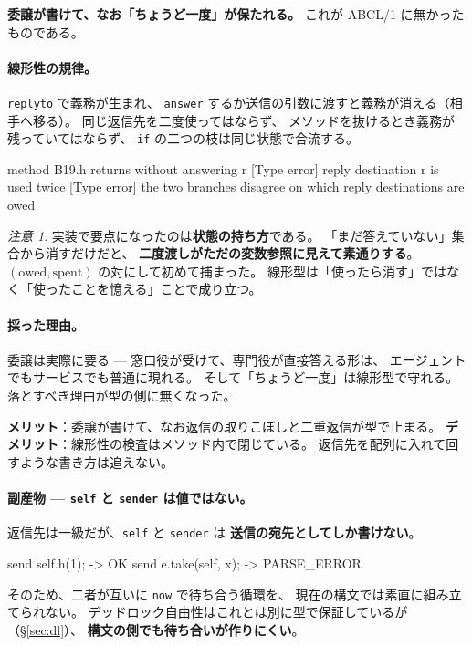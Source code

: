 \documentclass[11pt,a4paper]{ltjsarticle}
\theoremstyle{definition}
\theoremstyle{remark}
\newtheorem{remark}[theorem]{注意}
\begin{document}
\textbf{委譲が書けて、なお「ちょうど一度」が保たれる。}
これが ABCL/1 に無かったものである。

\paragraph{線形性の規律。}
\texttt{replyto} で義務が生まれ、
\texttt{answer} するか送信の引数に渡すと義務が消える（相手へ移る）。
同じ返信先を二度使ってはならず、
メソッドを抜けるとき義務が残っていてはならず、
\texttt{if} の二つの枝は同じ状態で合流する。

\begin{term}
 method B19.h returns without answering r
[Type error] reply destination r is used twice
[Type error] the two branches disagree on which reply destinations are owed
\end{term}

\begin{remark}
実装で要点になったのは\textbf{状態の持ち方}である。
「まだ答えていない」集合から消すだけだと、
\textbf{二度渡しがただの変数参照に見えて素通りする}。
$(\text{owed}, \text{spent})$ の対にして初めて捕まった。
線形型は「使ったら消す」ではなく「使ったことを憶える」ことで成り立つ。
\end{remark}

\paragraph{採った理由。}
委譲は実際に要る --- 窓口役が受けて、専門役が直接答える形は、
エージェントでもサービスでも普通に現れる。
そして「ちょうど一度」は線形型で守れる。
落とすべき理由が型の側に無くなった。

\textbf{メリット}：委譲が書けて、なお返信の取りこぼしと二重返信が型で止まる。
\textbf{デメリット}：線形性の検査はメソッド内で閉じている。
返信先を配列に入れて回すような書き方は追えない。

\paragraph{副産物 --- \texttt{self} と \texttt{sender} は値ではない。}
返信先は一級だが、\texttt{self} と \texttt{sender} は
\textbf{送信の宛先としてしか書けない}。

\begin{term}
send self.h(1);          -> OK
send e.take(self, x);    -> PARSE_ERROR
\end{term}

そのため、二者が互いに \texttt{now} で待ち合う循環を、
現在の構文では素直に組み立てられない。
デッドロック自由性はこれとは別に型で保証しているが（\S\ref{sec:dl}）、
\textbf{構文の側でも待ち合いが作りにくい}。
\end{document}
